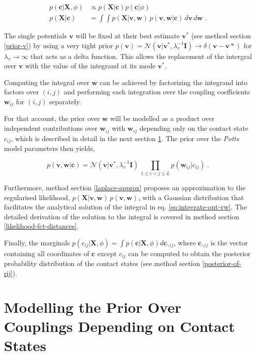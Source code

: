 \documentclass[11pt,a4paper,twoside]{book}
\newcommand{\Gauss}{\mathcal{N}}
\newcommand{\I}{\mathbf{I}}
\renewcommand{\c}{\mathbf{c}}
\newcommand{\cij}{c_{ij}}
\renewcommand{\v}{\mathbf{v}}
\newcommand{\w}{\mathbf{w}}
\newcommand{\wij}{\mathbf{w}_{ij}}
\newcommand{\X}{\mathbf{X}}
\theoremstyle{definition}
\theoremstyle{definition}
\theoremstyle{remark}
\begin{document}
\begin{align}
    p(\c | \X , \phi) &\propto  p(\X | \c) p(\c | \phi)\\
    p(\X | \c) &= \int \int p(\X | \v,\w) \, p(\v, \w | \c) \,d\v\,d\w  \; .
\label{eq:integrate-out-vw}
\end{align}

The single potentials \(\v\) will be fixed at their best estimate
\(\v^*\) (see method section \ref{prior-v}) by using a very tight prior
\(p(\v) = \Gauss(\v|\v^*,\lambda_v^{-1} \I) \rightarrow \delta(\v-\v*)\)
for \(\lambda_v \rightarrow \infty\) that acts as a delta function. This
allows the replacement of the intergral over \(\v\) with the value of
the integrand at its mode \(\v^*\).

Computing the integral over \(\w\) can be achieved by factorizing the
integrand into factors over \((i,j)\) and performing each integration
over the coupling coefficients \(\wij\) for \((i,j)\) separately.

For that account, the prior over \(\w\) will be modelled as a product
over independent contributions over \(\wij\) with \(\wij\) depending
only on the contact state \(\cij\), which is described in detail in the
next section \ref{coupling-prior}. The prior over the \emph{Potts} model
parameters then yields,

\begin{equation}
  p(\v,\w|\c) = \Gauss(\v|\v^*,\lambda_v^{-1} \I) \, \prod_{1\le i<j\le L} p(\wij|\cij) \; .
\label{eq:definition-parameter-prior}
\end{equation}

Furthermore, method section \ref{laplace-approx} proposes an
approximation to the regularised likelihood,
\(p(\X | \v,\w) \, p(\v, \w)\), with a Gaussian distribution that
facilitates the analytical solution of the integral in eq.
\eqref{eq:integrate-out-vw}. The detailed derivation of the solution to
the integral is covered in method section
\ref{likelihood-fct-distances}.

Finally, the marginals
\(p(\cij | \X, \phi) = \int p(\c | \X, \phi) d \c_{\backslash ij}\),
where \(\c_{\backslash ij}\) is the vector containing all coordinates of
\(\c\) except \(\cij\) can be computed to obtain the posterior
probability distribution of the contact states (see method section
\ref{posterior-of-rij}).

\section{Modelling the Prior Over Couplings Depending on Contact
States}\label{coupling-prior}
\end{document}
